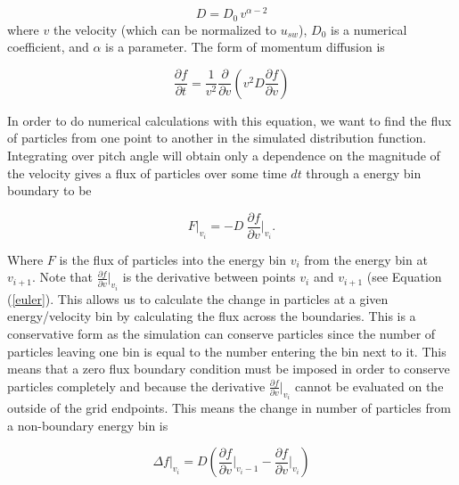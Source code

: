 \documentclass[%
 reprint,
 amsmath,amssymb,
 aps,
]{revtex4-1}
\begin{document}
\begin{equation}
D = D_0 \, v^{\alpha-2}
\end{equation}
where $v$ the velocity (which can be normalized to $u_{sw}$), $D_0$ is a numerical coefficient, and $\alpha$ is a parameter. The form of momentum diffusion is \cite{Jokipii and Lee 2010}

\begin{equation}
    \frac{\partial f}{\partial t} = 
    \frac{1}{v^2} \frac{\partial}{\partial v} \left( v^2 D \frac{\partial f}{\partial v} \right)
\end{equation}

In order to do numerical calculations with this equation, we want to find the flux of particles from one point to another in the simulated distribution function. Integrating over pitch angle will obtain only a dependence on the magnitude of the velocity gives a flux of particles over some time $dt$ through a energy bin boundary to be

\begin{equation}
    F \biggr\rvert _{v_i}  =  - D \ \frac{\partial f}{\partial v} \biggr\rvert _{v_i}.
\end{equation}

Where $F$ is the flux of particles into the energy bin $v_i$ from the energy bin at $v_{i+1}$. Note that $\displaystyle \frac{\partial f}{\partial v} \biggr\rvert_{v_i}$ is the derivative between points $v_i$ and $v_{i+1}$ (see Equation (\ref{euler}). This allows us to calculate the change in particles at a given energy/velocity bin by calculating the flux across the boundaries. This is a conservative form as the simulation can conserve particles since the number of particles leaving one bin is equal to the number entering the bin next to it. This means that a zero flux boundary condition must be imposed in order to conserve particles completely and because the derivative $\displaystyle \frac{\partial f}{\partial v}\biggr\rvert_{v_i}$ cannot be evaluated on the outside of the grid endpoints. This means the change in number of particles from a non-boundary energy bin is


\begin{equation}
    \Delta f \biggr\rvert_{v_i}  =   D \left( \frac{\partial f}{\partial v} \biggr\rvert_{v_i-1} - \frac{\partial f}{\partial v} \biggr\rvert_{v_{i}}  \right)
\end{equation}
\end{document}
